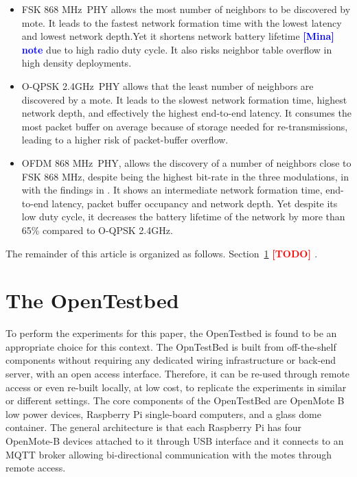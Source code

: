 \documentclass[journal]{IEEEtran}
\newcommand{\fsk}          {FSK 868 MHz}
\newcommand{\oqpsk}        {O-QPSK 2.4GHz}
\newcommand{\ofdm}         {OFDM 868 MHz}
\newcommand{\todo}[1]      {\textbf{\textcolor{red}{[TODO] #1}}}
\newcommand{\mina}[1]      {\textbf{\textcolor{blue}{[Mina] #1}}}
\begin{document}
\begin{itemize}
   \item \fsk\ PHY allows the most number of neighbors to be discovered by mote. 
    It leads to the fastest network formation time with the lowest latency and lowest network depth.Yet it shortens network battery lifetime \mina{note} due to high radio duty cycle. 
    It also risks neighbor table overflow in high density deployments.
   
   \item \oqpsk\  PHY allows that the least number of neighbors are discovered by a mote. 
   It leads to the slowest network formation time, highest network depth, and effectively the highest end-to-end latency. 
   It consumes the most packet buffer on average because of storage needed for re-transmissions, leading to a higher risk of packet-buffer overflow. 
   
   \item \ofdm\ PHY, allows the discovery of a number of neighbors close to \fsk, despite being the highest bit-rate in the three modulations, in with the findings in \cite{munoz18evaluationa}. 
   It shows an intermediate network formation time, end-to-end latency, packet buffer occupancy and network depth.
   Yet despite its low duty cycle, it decreases the battery lifetime of the network by more than 65\% compared to \oqpsk.
\end{itemize}
  

The remainder of this article is organized as follows.
Section~\ref{sec:opentested} \todo{}.

\section{The OpenTestbed}
\label{sec:opentested}

To perform the experiments for this paper, the OpenTestbed \cite{munoz19opentestbed} is found to be an appropriate choice for this context.
The OpnTestBed is built from off-the-shelf components without requiring any dedicated wiring infrastructure or back-end server, with an open access interface. 
Therefore, it can be re-used through remote access or even re-built locally, at low cost, to replicate the experiments in similar or different settings.  
The core components of the OpenTestBed are OpenMote B low power devices, Raspberry Pi single-board computers, and a glass dome container.
The general architecture is that each Raspberry Pi has four OpenMote-B devices attached to it through USB interface and it connects to an MQTT broker allowing bi-directional communication with the motes through remote access. 
\end{document}
